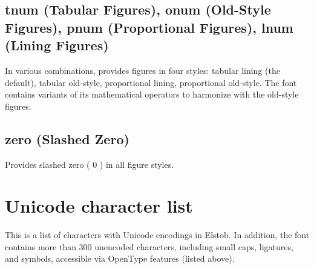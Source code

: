 \documentclass[12pt,letterpaper,openany]{book}
\begin{document}
\section{tnum (Tabular Figures), onum (Old-Style Figures), pnum (Proportional
Figures), lnum (Lining Figures)}
In various combinations, provides figures in four styles:
tabular lining (the default),
tabular old-style,
proportional lining,
proportional old-style. The font contains variants of its mathematical
operators to harmonize with the old-style figures.

\section{zero (Slashed Zero)}
Provides slashed zero ({ 0 }) in all figure styles.

\chapter{Unicode character list}

This is a list of characters with Unicode encodings in Elstob. In addition, the
font contains more than 300 unencoded characters, including small
caps, ligatures, and symbols, accessible via OpenType features (listed above).
\end{document}
